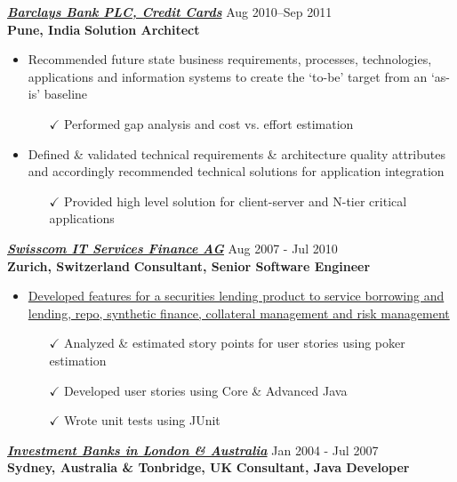      \vspace{-2pt}  
{\sl \href{www.btci.barclays.com}{\textbf{Barclays Bank PLC, Credit Cards}}} \hfill Aug 2010--Sep 2011  \\
 {\textbf{Pune, India}} \hfill   \textbf{ Solution Architect}
\begin{itemize}\itemsep -2pt
 \item {Recommended future state business requirements, processes, technologies, applications and information systems to create the `to-be' target from an `as-is' baseline} \itemsep -2pt
   \begin{itemize} \item[$\checkmark$]  \itemsep -8pt
   Performed gap analysis and cost vs. effort estimation
   \end{itemize}
    \item {Defined \& validated technical requirements \& architecture quality attributes and accordingly recommended technical solutions for application integration} \itemsep -2pt
    \begin{itemize} \item[$\checkmark$]  \itemsep -8pt 
    Provided high level solution for client-server and N-tier critical applications
   \end{itemize}
   \end{itemize}
   
   \vspace{-6pt}
 
{\sl \href{http://www.swisscom.ch/its/en/it-services/solutions/finance.html}{\textbf{Swisscom IT Services Finance AG}}}       \hfill               Aug 2007 - Jul 2010 \\
\textbf{Zurich, Switzerland} \hfill \textbf{Consultant, Senior Software Engineer}
 \begin{itemize} \itemsep -2pt
 \item  \href{http://financialsystems.sungard.com/solutions/securities-finance} {Developed features for a securities lending product to service borrowing and lending, repo, synthetic finance, collateral management and risk management}
    \begin{itemize}
 \item[$\checkmark$] Analyzed \& estimated story points for user stories using poker estimation
    \item[$\checkmark$] Developed user stories using Core \& Advanced Java\\
     \item[$\checkmark$] Wrote unit tests using JUnit
 \end{itemize}
 \end{itemize}
    \vspace{-3pt}
{\sl \href{https://www.commbank.com.au/}{\textbf{Investment Banks in London \& Australia}}}       \hfill               Jan 2004 - Jul 2007 \\
\textbf{Sydney, Australia \& Tonbridge, UK} \hfill \textbf{Consultant, Java Developer}


